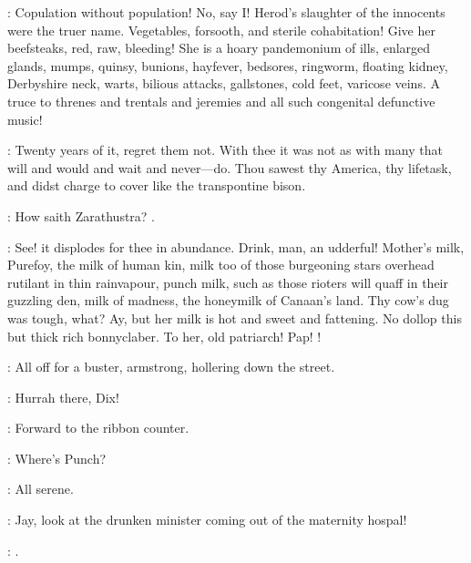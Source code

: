 \documentclass[12pt]{article}
\begin{document}
: Copulation without population! No, say I! Herod's slaughter of the
innocents were the truer name. Vegetables, forsooth, and sterile
cohabitation! Give her beefsteaks, red, raw, bleeding! She is a hoary
pandemonium of ills, enlarged glands, mumps, quinsy, bunions, hayfever,
bedsores, ringworm, floating kidney, Derbyshire neck, warts, bilious
attacks, gallstones, cold feet, varicose veins. A truce to threnes and
trentals and jeremies and all such congenital defunctive music!

: Twenty years of it, regret them not. With thee it was not as with
many that will and would and wait and never---do. Thou sawest thy America,
thy lifetask, and didst charge to cover like the transpontine bison.

: How saith Zarathustra?
.

: See! it displodes for thee in abundance. Drink, man, an
udderful! Mother's milk, Purefoy, the milk of human kin, milk too of
those burgeoning stars overhead rutilant in thin rainvapour, punch milk,
such as those rioters will quaff in their guzzling den, milk of madness,
the honeymilk of Canaan's land. Thy cow's dug was tough, what? Ay, but
her milk is hot and sweet and fattening. No dollop this but thick rich
bonnyclaber. To her, old patriarch! Pap!
!



: All off for a buster, armstrong, hollering down the street.








\Md: Hurrah there, Dix!

: Forward to the ribbon counter.

\Dx: Where's Punch?

: All serene.

\By: Jay, look at the drunken minister coming out of the maternity hospal!

\Mu: .
\end{document}
